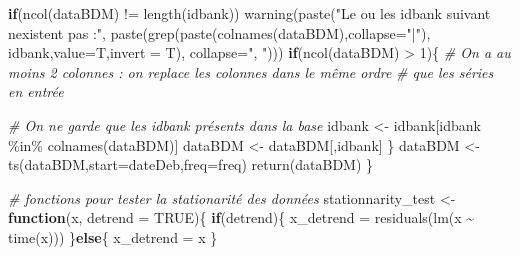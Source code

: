 \documentclass[
  11pt,
]{article}
\newenvironment{Shaded}{\begin{snugshade}}{\end{snugshade}}
\newcommand{\AttributeTok}[1]{\textcolor[rgb]{0.77,0.63,0.00}{#1}}
\newcommand{\CommentTok}[1]{\textcolor[rgb]{0.56,0.35,0.01}{\textit{#1}}}
\newcommand{\ConstantTok}[1]{\textcolor[rgb]{0.00,0.00,0.00}{#1}}
\newcommand{\ControlFlowTok}[1]{\textcolor[rgb]{0.13,0.29,0.53}{\textbf{#1}}}
\newcommand{\DecValTok}[1]{\textcolor[rgb]{0.00,0.00,0.81}{#1}}
\newcommand{\FunctionTok}[1]{\textcolor[rgb]{0.00,0.00,0.00}{#1}}
\newcommand{\NormalTok}[1]{#1}
\newcommand{\OtherTok}[1]{\textcolor[rgb]{0.56,0.35,0.01}{#1}}
\newcommand{\SpecialCharTok}[1]{\textcolor[rgb]{0.00,0.00,0.00}{#1}}
\newcommand{\StringTok}[1]{\textcolor[rgb]{0.31,0.60,0.02}{#1}}
\begin{document}
\begin{Shaded}
\begin{Highlighting}[]
    \ControlFlowTok{if}\NormalTok{(}\FunctionTok{ncol}\NormalTok{(dataBDM) }\SpecialCharTok{!=} \FunctionTok{length}\NormalTok{(idbank))}
        \FunctionTok{warning}\NormalTok{(}\FunctionTok{paste}\NormalTok{(}\StringTok{"Le ou les idbank suivant n\textquotesingle{}existent pas :"}\NormalTok{,}
                      \FunctionTok{paste}\NormalTok{(}\FunctionTok{grep}\NormalTok{(}\FunctionTok{paste}\NormalTok{(}\FunctionTok{colnames}\NormalTok{(dataBDM),}\AttributeTok{collapse=}\StringTok{"|"}\NormalTok{),}
\NormalTok{                                 idbank,}\AttributeTok{value=}\NormalTok{T,}\AttributeTok{invert =}\NormalTok{ T),}
                            \AttributeTok{collapse=}\StringTok{", "}\NormalTok{)))}
    \ControlFlowTok{if}\NormalTok{(}\FunctionTok{ncol}\NormalTok{(dataBDM) }\SpecialCharTok{\textgreater{}} \DecValTok{1}\NormalTok{)\{}
        \CommentTok{\# On a au moins 2 colonnes : on replace les colonnes dans le même ordre }
        \CommentTok{\# que les séries en entrée}
        
        \CommentTok{\# On ne garde que les idbank présents dans la base}
\NormalTok{        idbank }\OtherTok{\textless{}{-}}\NormalTok{ idbank[idbank }\SpecialCharTok{\%in\%} \FunctionTok{colnames}\NormalTok{(dataBDM)]}
\NormalTok{        dataBDM }\OtherTok{\textless{}{-}}\NormalTok{ dataBDM[,idbank]}
\NormalTok{    \}}
\NormalTok{    dataBDM }\OtherTok{\textless{}{-}} \FunctionTok{ts}\NormalTok{(dataBDM,}\AttributeTok{start=}\NormalTok{dateDeb,}\AttributeTok{freq=}\NormalTok{freq)}
    \FunctionTok{return}\NormalTok{(dataBDM)}
\NormalTok{\}}

\CommentTok{\# fonctions pour tester la stationarité des données}
\NormalTok{stationnarity\_test }\OtherTok{\textless{}{-}} \ControlFlowTok{function}\NormalTok{(x, }\AttributeTok{detrend =} \ConstantTok{TRUE}\NormalTok{)\{}
    \ControlFlowTok{if}\NormalTok{(detrend)\{}
\NormalTok{        x\_detrend }\OtherTok{=} \FunctionTok{residuals}\NormalTok{(}\FunctionTok{lm}\NormalTok{(x }\SpecialCharTok{\textasciitilde{}} \FunctionTok{time}\NormalTok{(x)))}
\NormalTok{    \}}\ControlFlowTok{else}\NormalTok{\{}
\NormalTok{        x\_detrend }\OtherTok{=}\NormalTok{ x}
\NormalTok{    \}}
    

\end{Highlighting}
\end{Shaded}
\end{document}
